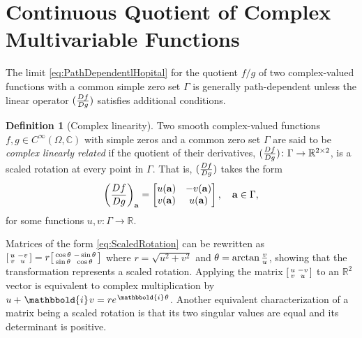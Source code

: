 \documentclass{article}
\theoremstyle{theorem}
\theoremstyle{definition}
\newtheorem{definition}{Definition}
\def\CC{\mathbb{C}}
\def\RR{\mathbb{R}}
\def\ba{\mathbf{a}}
\newcommand{\ii}{\mkern1.5mu\mathbbold{i}\mkern1.5mu}
\begin{document}
\section{Continuous Quotient of Complex Multivariable Functions}
\label{sec:QuotientOfComplexMultivariableFunctions}
The limit \eqref{eq:PathDependentlHopital} for the quotient \(f/g\) of two complex-valued functions with a common simple zero set \(\Gamma\) is generally path-dependent unless the linear operator \(({Df\over Dg})\) satisfies additional conditions.
\begin{definition}[Complex linearity]
\label{def:ConformalEquivalence}
    Two smooth complex-valued functions \(f,g\in C^\infty(\Omega,\CC)\) with simple zeros and a common zero set \(\Gamma\) are said to be \emph{complex linearly related} if the quotient of their derivatives, \(({Df\over Dg})\colon\Gamma\to\RR^{2\times 2}\), is a scaled rotation at every point in \(\Gamma\).  That is, \(({Df\over Dg})\) takes the form
    \begin{align}\label{eq:ScaledRotation}
        \left({Df\over Dg}\right)_{\ba} = 
        \begin{bmatrix}
            u(\ba)&-v(\ba)\\
            v(\ba)&u(\ba)
        \end{bmatrix},\quad\ba\in\Gamma,
    \end{align}
    for some functions \(u,v\colon\Gamma\to\RR\).
\end{definition}

Matrices of the form \eqref{eq:ScaledRotation} can be rewritten as \(
\begin{bsmallmatrix}
    u&-v\\
    v & u
\end{bsmallmatrix}
= r
\begin{bsmallmatrix}
    \cos\theta & -\sin\theta\\
    \sin\theta & \cos\theta
\end{bsmallmatrix}
\) where \(r = \sqrt{u^2 + v^2}\) and \(\theta = \arctan{v\over u}\), showing that the transformation represents a scaled rotation.
Applying the matrix \(\begin{bsmallmatrix}
    u&-v\\
    v & u
\end{bsmallmatrix}\) to an \(\RR^2\) vector is equivalent to complex multiplication by \(u+\ii v = re^{\ii\theta}\).
Another equivalent characterization of a matrix being a scaled rotation is that its two singular values are equal and its determinant is positive.
\end{document}
